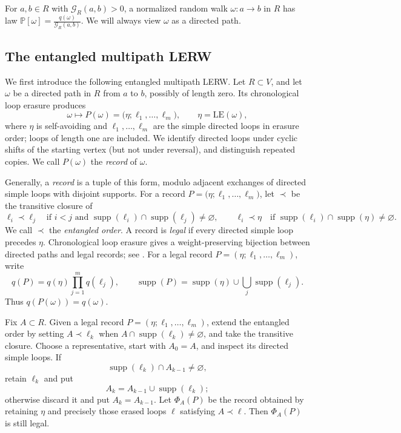 \documentclass[11pt]{article}
\numberwithin{equation}{section}
\newcommand{\1}{\mathbf{1}}
\newcommand{\LE}{\mathrm{LE}}
\newcommand{\supp}{\operatorname{supp}}
\newcommand{\Prob}{\mathbb P}
\newcommand{\Gc}{\mathcal G}
\begin{document}
For $a,b\in R$ with $\Gc_R(a,b)>0$, a normalized random walk $\omega:a\to b$ in $R$ has law $\Prob[\omega]=\frac{q(\omega)}{\Gc_R(a,b)}.$
We will always view $\omega$ as a directed path.


\subsection{The entangled multipath LERW}
\label{subsec:entangled-multipath}

We first introduce the following entangled multipath LERW.  Let $R\subset V$, and let $\omega$ be
a directed path in $R$ from $a$ to $b$, possibly of length zero.  Its
chronological loop erasure produces
\[
 \omega\longmapsto P(\omega)
 =\bigl(\eta;\ell_1,\ldots,\ell_m\bigr),
 \qquad \eta=\LE(\omega),
\]
where $\eta$ is self-avoiding and $\ell_1,\ldots,\ell_m$ are the simple
directed loops in erasure order; loops of length one are included.  We
identify directed loops under cyclic shifts of the starting vertex (but not
under reversal), and distinguish repeated copies.  We call $P(\omega)$ the
\emph{record} of $\omega$.

Generally, a \emph{record} is a tuple of this form, modulo adjacent exchanges
of directed simple loops with disjoint supports. For a record $P
 =\bigl(\eta;\ell_1,\ldots,\ell_m\bigr)$, let $\prec$ be the transitive closure of
\[
 \ell_i\prec\ell_j
 \quad\text{if }i<j\text{ and }
 \supp(\ell_i)\cap\supp(\ell_j)\ne\varnothing,
 \qquad
 \ell_i\prec\eta
 \quad\text{if }
 \supp(\ell_i)\cap\supp(\eta)\ne\varnothing.
\]
We call $\prec$ the \emph{entangled order}.  A record is \emph{legal} if
every directed simple loop precedes $\eta$.  Chronological loop erasure gives a
weight-preserving bijection between directed paths and legal records;
see \cite[Theorem~A.5]{Hel16}.  For a legal record
$P=(\eta;\ell_1,\ldots,\ell_m)$, write
\[
 q(P)=q(\eta)\prod_{j=1}^m q(\ell_j),
 \qquad
 \supp(P)=\supp(\eta)\cup\bigcup_j\supp(\ell_j).
\]
Thus $q(P(\omega))=q(\omega)$.

Fix $A\subset R$.  Given a legal record $P=(\eta;\ell_1,\ldots,\ell_m)$,
extend the entangled order by setting $A\prec\ell_k$ when $A\cap\supp(\ell_k)\ne\varnothing$, and take the transitive closure.  Choose a representative, start with $A_0=A$, and inspect its directed simple loops.  If
\[
  \supp(\ell_k)\cap A_{k-1}\ne\varnothing,
\]
retain $\ell_k$ and put
\[
  A_k=A_{k-1}\cup\supp(\ell_k);
\]
otherwise discard it and put $A_k=A_{k-1}$.  
Let \(\Phi_A(P)\) be the record obtained by retaining \(\eta\) and precisely those erased loops \(\ell\) satisfying \(A\prec\ell\). Then \(\Phi_A(P)\) is still legal.
\end{document}
